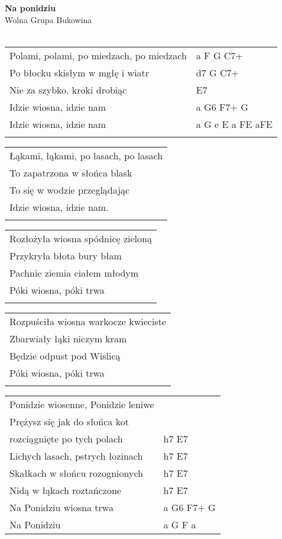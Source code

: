 \documentclass[a5paper]{article}
\begin{document}


\noindent
\fontsize{12pt}{15pt}\selectfont
\textbf{Na ponidziu} \\
\fontsize{8pt}{10pt}\selectfont
Wolna Grupa Bukowina \\ \\
\fontsize{10pt}{12pt}\selectfont
{}
\begin{tabular}{@{}p{7.50cm}p{3cm}@{}}
\noindent
Polami, polami, po miedzach, po miedzach & a F G C7+ \\
Po błocku skisłym w mgłę i wiatr & d7 G C7+ \\
Nie za szybko, kroki drobiąc & E7 \\
Idzie wiosna, idzie nam & a G6 F7+ G \\
Idzie wiosna, idzie nam & a G e E a FE aFE \\ \\
\end{tabular}

\noindent
\begin{tabular}{@{}p{7.50cm}@{}}
Łąkami, łąkami, po lasach, po lasach \\
To zapatrzona w słońca blask \\
To się w wodzie przeglądając \\
Idzie wiosna, idzie nam. \\ \\
\end{tabular}

\noindent
\begin{tabular}{@{}p{7.50cm}@{}}
Rozłożyła wiosna spódnicę zieloną \\
Przykryła błota bury błam \\
Pachnie ziemia ciałem młodym \\
Póki wiosna, póki trwa \\ \\
\end{tabular}

\noindent
\begin{tabular}{@{}p{7.50cm}@{}}
Rozpuściła wiosna warkocze kwieciste \\
Zbarwiały łąki niczym kram \\
Będzie odpust pod Wislicą \\
Póki wiosna, póki trwa \\ \\
\end{tabular}

\noindent
\begin{tabular}{@{}p{7.50cm}p{3cm}@{}}
Ponidzie wiosenne, Ponidzie leniwe & \\
Prężysz się jak do słońca kot & \\
rozciągnięte po tych polach & h7 E7 \\
Lichych lasach, pstrych łozinach & h7 E7 \\
Skałkach w słońcu rozognionych & h7 E7 \\
Nidą w łąkach roztańczone & h7 E7 \\
Na Ponidziu wiosna trwa & a G6 F7+ G \\ 
Na Ponidziu & a G F a
\end{tabular}
\end{document}
